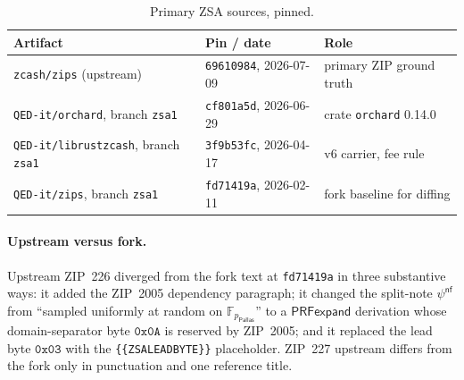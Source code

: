 \documentclass[11pt,a4paper]{article}
\theoremstyle{definition}
\newcommand{\F}{\mathbb{F}}
\newcommand{\nfsym}{\mathsf{nf}}
\newcommand{\Pallas}{\ensuremath{\mathsf{Pallas}}}
\begin{document}
\begin{table}[htbp]
\centering
\small
\begin{tabular}{@{}lll@{}}
\toprule
Artifact & Pin / date & Role \\
\midrule
\texttt{zcash/zips} (upstream)
  & \texttt{69610984}, 2026-07-09 & primary ZIP ground truth \\
\texttt{QED-it/orchard}, branch \texttt{zsa1}
  & \texttt{cf801a5d}, 2026-06-29 & crate \texttt{orchard} 0.14.0 \\
\texttt{QED-it/librustzcash}, branch \texttt{zsa1}
  & \texttt{3f9b53fc}, 2026-04-17 & v6 carrier, fee rule \\
\texttt{QED-it/zips}, branch \texttt{zsa1}
  & \texttt{fd71419a}, 2026-02-11 & fork baseline for diffing \\
\bottomrule
\end{tabular}
\caption{Primary ZSA sources, pinned.}
\label{tab:zsa-sources}
\end{table}

\paragraph{Upstream versus fork.} Upstream ZIP~226 diverged from the fork text
at \texttt{fd71419a} in three substantive ways: it added the ZIP~2005
dependency paragraph; it changed the split-note $\psi^{\nfsym}$ from
``sampled uniformly at random on $\F_{p_{\Pallas}}$'' to a
$\mathsf{PRFexpand}$ derivation whose domain-separator byte $\mathtt{0x0A}$ is
reserved by ZIP~2005; and it replaced the lead byte $\mathtt{0x03}$ with the
\texttt{\{\{ZSALEADBYTE\}\}} placeholder. ZIP~227 upstream differs from the
fork only in punctuation and one reference title.
\end{document}
